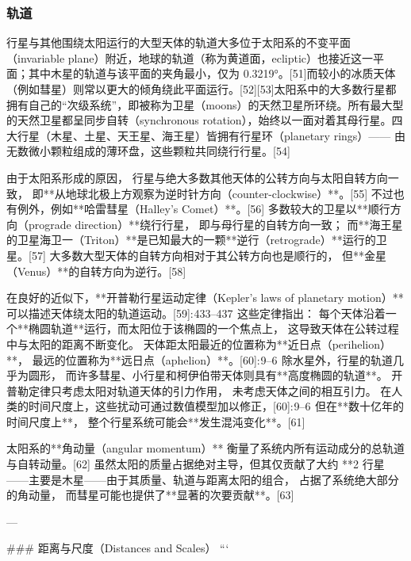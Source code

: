 \subsubsection{轨道}
行星与其他围绕太阳运行的大型天体的轨道大多位于太阳系的不变平面（invariable plane）附近，地球的轨道（称为黄道面，ecliptic）也接近这一平面；其中木星的轨道与该平面的夹角最小，仅为 0.3219°。[51]而较小的冰质天体（例如彗星）则常以更大的倾角绕此平面运行。[52][53]太阳系中的大多数行星都拥有自己的“次级系统”，即被称为卫星（moons）的天然卫星所环绕。所有最大型的天然卫星都呈同步自转（synchronous rotation），始终以一面对着其母行星。四大行星（木星、土星、天王星、海王星）皆拥有行星环（planetary rings）——  
由无数微小颗粒组成的薄环盘，这些颗粒共同绕行行星。[54]

由于太阳系形成的原因，  
行星与绝大多数其他天体的公转方向与太阳自转方向一致，  
即**从地球北极上方观察为逆时针方向（counter-clockwise）**。[55]  
不过也有例外，例如**哈雷彗星（Halley’s Comet）**。[56]  
多数较大的卫星以**顺行方向（prograde direction）**绕行行星，  
即与母行星的自转方向一致；  
而**海王星的卫星海卫一（Triton）**是已知最大的一颗**逆行（retrograde）**运行的卫星。[57]  
大多数大型天体的自转方向相对于其公转方向也是顺行的，  
但**金星（Venus）**的自转方向为逆行。[58]

在良好的近似下，**开普勒行星运动定律（Kepler’s laws of planetary motion）**  
可以描述天体绕太阳的轨道运动。[59]: 433–437   
这些定律指出：  
每个天体沿着一个**椭圆轨道**运行，而太阳位于该椭圆的一个焦点上，  
这导致天体在公转过程中与太阳的距离不断变化。  
天体距太阳最近的位置称为**近日点（perihelion）**，  
最远的位置称为**远日点（aphelion）**。[60]: 9–6   
除水星外，行星的轨道几乎为圆形，  
而许多彗星、小行星和柯伊伯带天体则具有**高度椭圆的轨道**。  
开普勒定律只考虑太阳对轨道天体的引力作用，  
未考虑天体之间的相互引力。  
在人类的时间尺度上，这些扰动可通过数值模型加以修正，[60]: 9–6   
但在**数十亿年的时间尺度上**，  
整个行星系统可能会**发生混沌变化**。[61]

太阳系的**角动量（angular momentum）**  
衡量了系统内所有运动成分的总轨道与自转动量。[62]  
虽然太阳的质量占据绝对主导，但其仅贡献了大约 **2%
行星——主要是木星——由于其质量、轨道与距离太阳的组合，  
占据了系统绝大部分的角动量，  
而彗星可能也提供了**显著的次要贡献**。[63]

---

### 距离与尺度（Distances and Scales）
```


